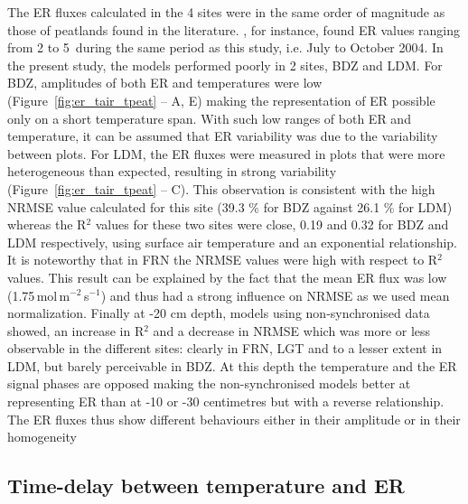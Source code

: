 The ER fluxes calculated in the 4 sites were in the same order of magnitude as those of peatlands found in the literature.
\citet{bortoluzzi2006}, for instance, found ER values ranging from 2 to 5\, during the same period as this study, i.e. July to October 2004.
In the present study, the models performed poorly in 2 sites, BDZ and LDM.
For BDZ, amplitudes of both ER and temperatures were low  (Figure~\ref{fig:er_tair_tpeat} -- A, E) making the representation of ER possible only on a short temperature span.
With such low ranges of both ER and temperature, it can be assumed that ER variability was due to the variability between plots.
For LDM, the ER fluxes were measured in plots that were more heterogeneous than expected, resulting in strong variability (Figure~\ref{fig:er_tair_tpeat} -- C).
This observation is consistent with the high NRMSE value calculated for this site (39.3 \% for BDZ against 26.1 \% for LDM) whereas the R$^{2}$ values for these two sites were close, 0.19 and 0.32 for BDZ and LDM respectively, using surface air temperature and an exponential relationship.
It is noteworthy that in FRN the NRMSE values were high with respect to R$^{2}$ values.
This result can be explained by the fact that the mean ER flux was low (1.75\,\textmu mol\,m$^{-2}$\,s$^{-1}$) and thus had a strong influence on NRMSE as we used mean normalization.
Finally at -20 cm depth, models using non-synchronised data showed, an increase in R$^{2}$ and a decrease in NRMSE which was more or less observable in the different sites:
clearly in FRN, LGT and to a lesser extent in LDM, but barely perceivable in BDZ.
At this depth the temperature and the ER signal phases are opposed making the non-synchronised models better at representing ER than at -10 or -30 centimetres but with a reverse relationship.
The ER fluxes thus show different behaviours either in their amplitude or in their homogeneity

\subsection{Time-delay between temperature and ER}

